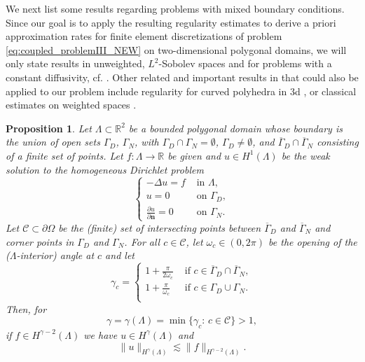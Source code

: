 \documentclass{amsart}
\newcommand{\domain}{\Lambda}
\def\vn{{\mathbf n}}
\def\R{{\mathbb R}}
\theoremstyle{plain}
\newtheorem{proposition}{Proposition}
\numberwithin{equation}{section}
\numberwithin{table}{section}
\numberwithin{figure}{section}
\numberwithin{theorem}{section}
\numberwithin{corollary}{section}
\numberwithin{definition}{section}
\numberwithin{lemma}{section}
\numberwithin{proposition}{section}
\numberwithin{remark}{section}
\begin{document}
We next list some results regarding problems with mixed boundary conditions. Since our goal is to apply the resulting regularity estimates to derive a priori approximation rates for finite element discretizations of problem \eqref{eq:coupled_problemIII_NEW} on two-dimensional polygonal domains, we will only state results in unweighted, $L^2$-Sobolev spaces and for problems with a constant diffusivity, cf. \cite{Gr76}. Other related and important results in that could also be applied to our problem include regularity for curved polyhedra in 3d \cite{Da92}, or classical estimates on weighted spaces \cite{Ko67}.

\begin{proposition} \label{prop:local-regularity-mixed}
Let $\domain \subset \R^2$ be a bounded polygonal domain whose boundary is the union of open sets $\Gamma_D$, $\Gamma_N$, with $\Gamma_D \cap \Gamma_N = \emptyset$, $\Gamma_D \neq \emptyset$, and $\overline \Gamma_D \cap \overline\Gamma_N$ consisting of a finite set of points. Let $f \colon \domain \to \R$ be given and $u \in H^1(\domain)$ be the weak solution to the homogeneous Dirichlet problem
\[
 \left\lbrace \begin{aligned}
- \Delta u = f  & \mbox{ in } \domain, \\
u = 0 & \mbox{ on } \Gamma_D, \\
\frac{\partial u}{\partial \vn} = 0 & \mbox{ on } \Gamma_N.
\end{aligned} \right.
\]
Let $\mathcal{C} \subset \partial \Omega$ be the (finite) set of intersecting points between $\overline\Gamma_D$ and $\overline\Gamma_N$ and corner points in $\Gamma_D$ and $\Gamma_N$. For all $c \in \mathcal{C}$, let $\omega_c \in (0, 2 \pi)$ be the opening of the ($\domain$-interior) angle at $c$ and let
 \[
 \gamma_c = \left\lbrace \begin{array}{lr} 
 1 + \frac{\pi}{2\omega_c} & \mbox{ if } c \in \overline \Gamma_D \cap \overline\Gamma_N , \\
 1+ \frac{\pi}{\omega_c} & \mbox{ if } c \in \Gamma_D \cup \Gamma_N .\\
 \end{array} \right.
 \]
Then, for 
 \[\gamma = \gamma(\domain) =  \min\{\gamma_c : \,  c  \in \mathcal{C} \}>1, \]
if $f  \in H^{\gamma-2}(\domain)$ we have $u \in H^\gamma(\domain)$ and
\[
\| u \|_{H^\gamma(\domain)} \lesssim \| f \|_{H^{\gamma-2}(\domain)}.
\]

\end{proposition}


\end{document}
